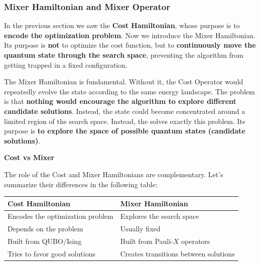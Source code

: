 \subsubsection{Mixer Hamiltonian and Mixer Operator}\label{sec:mixer-hamiltonian-and-mixer-operator}

In the previous section we saw the \textbf{Cost Hamiltonian}, whose purpose is to \textbf{encode the optimization problem}. Now we introduce the Mixer Hamiltonian. Its purpose is \textbf{not} to optimize the cost function, but to \textbf{continuously move the quantum state through the search space}, preventing the algorithm from getting trapped in a fixed configuration.

\highspace
The Mixer Hamiltonian is fundamental. Without it, the Cost Operator would repeatedly evolve the state according to the same energy landscape. The problem is that \textbf{nothing would encourage the algorithm to explore different candidate solutions}. Instead, the state could become concentrated around a limited region of the search space. Instead, the  solves exactly this problem. Its purpose is \textbf{to explore the space of possible quantum states (candidate solutions)}.

\highspace
\begin{flushleft}
    \textcolor{Green3}{ \textbf{Cost vs Mixer}}
\end{flushleft}
The role of the Cost and Mixer Hamiltonians are complementary. Let's summarize their differences in the following table:

\begin{table}[!htp]
    \centering
    \begin{tabular}{@{} l l @{}}
        \toprule
        \textbf{Cost Hamiltonian} & \textbf{Mixer Hamiltonian} \\
        \midrule
        Encodes the optimization problem    & Explores the search space             \\
        Depends on the problem              & Usually fixed                         \\
        Built from QUBO/Ising               & Built from Pauli-$X$ operators        \\
        Tries to favor good solutions       & Creates transitions between solutions \\
        \bottomrule
    \end{tabular}
\end{table}

